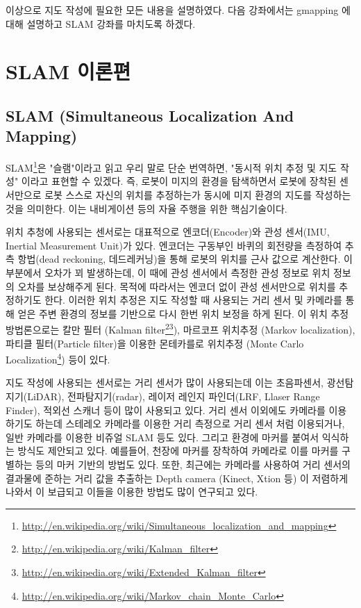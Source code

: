 이상으로 지도 작성에 필요한 모든 내용을 설명하였다. 다음 강좌에서는 gmapping 에 대해 설명하고 SLAM 강좌를 마치도록 하겠다.


\newpage
\section{SLAM 이론편}
\label{sec:SlamTheory}

\subsection{SLAM (Simultaneous Localization And Mapping)}

SLAM\footnote{\url{http://en.wikipedia.org/wiki/Simultaneous_localization_and_mapping}}은 "슬램"이라고 읽고 우리 말로 단순 번역하면, "동시적 위치 추정 및 지도 작성" 이라고 표현할 수 있겠다. 즉, 로봇이 미지의 환경을 탐색하면서 로봇에 장착된 센서만으로 로봇 스스로 자신의 위치를 추정하는가 동시에 미지 환경의 지도를 작성하는 것을 의미한다. 이는 내비게이션 등의 자율 주행을 위한 핵심기술이다.

위치 추청에 사용되는 센서로는 대표적으로 엔코더(Encoder)와 관성 센서(IMU, Inertial Measurement Unit)가 있다. 엔코더는 구동부인 바퀴의 회전량을 측정하여 추측 항법(dead reckoning, 데드레커닝)을 통해 로봇의 위치를 근사 값으로 계산한다. 이 부분에서 오차가 꾀 발생하는데, 이 때에 관성 센서에서 측정한 관성 정보로 위치 정보의 오차를 보상해주게 된다. 목적에 따라서는 엔코더 없이 관성 센서만으로 위치를 추정하기도 한다. 이러한 위치 추정은 지도 작성할 때 사용되는 거리 센서 및 카메라를 통해 얻은 주변 환경의 정보를 기반으로 다시 한번 위치 보정을 하게 된다. 이 위치 추정 방법론으로는 칼만 필터 (Kalman filter\footnote{\url{http://en.wikipedia.org/wiki/Kalman_filter}}\footnote{\url{http://en.wikipedia.org/wiki/Extended_Kalman_filter}}), 마르코프 위치추정 (Markov localization), 파티클 필터(Particle filter)을 이용한 몬테카를로 위치추정 (Monte Carlo Localization\footnote{\url{http://en.wikipedia.org/wiki/Markov_chain_Monte_Carlo}}) 등이 있다.

지도 작성에 사용되는 센서로는 거리 센서가 많이 사용되는데 이는 초음파센서, 광선탐지기(LiDAR), 전파탐지기(radar), 레이저 레인지 파인더(LRF, Llaser Range Finder), 적외선 스캐너 등이 많이 사용되고 있다. 거리 센서 이외에도 카메라를 이용하기도 하는데 스테레오 카메라를 이용한 거리 측정으로 거리 센서 처럼 이용되거나, 일반 카메라를 이용한 비쥬얼 SLAM 등도 있다. 그리고 환경에 마커를 붙여서 익식하는 방식도 제안되고 있다. 예를들어, 천장에 마커를 장착하여 카메라로 이를 마커를 구별하는 등의 마커 기반의 방법도 있다. 또한, 최근에는 카메라를 사용하여 거리 센서의 결과물에 준하는 거리 값을 추출하는 Depth camera (Kinect, Xtion 등) 이 저렴하게 나와서 이 보급되고 이들을 이용한 방법도 많이 연구되고 있다.


